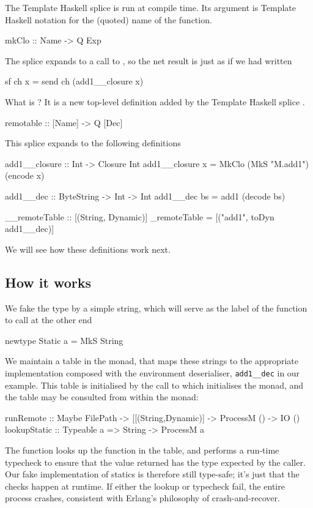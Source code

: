 \documentclass[preprint]{sigplanconf}
\begin{document}
The Template Haskell splice 
is run at compile time.  Its argument  is Template Haskell notation
for the (quoted) name of the  function.
\begin{code}
  mkClo :: Name -> Q Exp
\end{code}
The splice expands to a call to , 
so the net result is just as if we had written
\begin{code}
  sf ch x = send ch (add1__closure x)
\end{code}
What is ?  It is a new top-level definition
added by the Template Haskell splice .
\begin{code}
  remotable :: [Name] -> Q [Dec]
\end{code}
This splice expands to the following definitions
\begin{code}
  add1__closure :: Int -> Closure Int
  add1__closure x = MkClo (MkS "M.add1") (encode x)

  add1__dec :: ByteString -> Int -> Int
  add1__dec bs = add1 (decode bs)

  __remoteTable :: [(String, Dynamic)]
  _remoteTable = [("add1", toDyn add1__dec)]
\end{code}
We will see how these definitions work next.

\subsection{How it works}

We fake the  type by a simple string, which will serve as the 
label of the function to call at the other end
\begin{code}
  newtype Static a = MkS String
\end{code}
We maintain a table in the  monad, that maps these strings
to the appropriate implementation composed with the environment deserialiser,
\texttt{add1\_\_dec} in our example.
This table is initialised by the call to  which initialises the
 monad, and the table may be consulted from within the monad:
\begin{code}
  runRemote    :: Maybe FilePath
               -> [[(String,Dynamic)]
               -> ProcessM () -> IO ()
  lookupStatic :: Typeable a => String -> ProcessM a
\end{code}
The  function looks up the function in the table,
and performs a run-time typecheck to ensure that the value returned
has the type expected by the caller.  Our fake implementation of
statics is therefore still type-safe; it's just that the checks happen
at runtime.  If either the lookup or typecheck fail, the entire 
process crashes, consistent with Erlang's philosophy of crash-and-recover.
\end{document}
